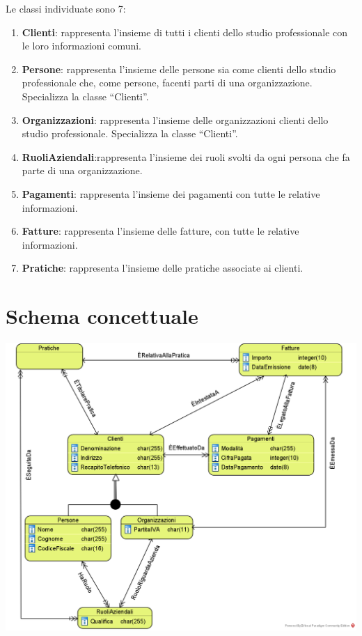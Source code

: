 \documentclass[a4paper,12pt]{article}
\begin{document}
Le classi individuate sono  7:
\begin{enumerate}
\item \textbf{Clienti}: rappresenta l’insieme di tutti i clienti dello studio professionale con le loro informazioni comuni.
\item \textbf{Persone}: rappresenta l’insieme delle persone sia come clienti dello studio professionale che, come persone, facenti parti di  una organizzazione. Specializza la classe “Clienti”.
\item \textbf{Organizzazioni}: rappresenta l’insieme delle organizzazioni clienti dello studio professionale. Specializza la classe “Clienti”.
\item \textbf{RuoliAziendali}:rappresenta l’insieme dei ruoli svolti da ogni persona che fa parte di una organizzazione.
\item \textbf{Pagamenti}: rappresenta l’insieme dei pagamenti con tutte le relative informazioni.
\item \textbf{Fatture}: rappresenta l’insieme delle fatture, con tutte le relative informazioni.
\item \textbf{Pratiche}: rappresenta l’insieme delle pratiche associate ai clienti.
\end{enumerate}

 \section{ Schema concettuale }

\begin{minipage}{\textwidth}
\begin{center}
\centering 
\centerline{
\includegraphics[width=\textwidth]{ Schema concettuale a oggetti.png }
}
\end{center}
\end{minipage}
\end{document}

